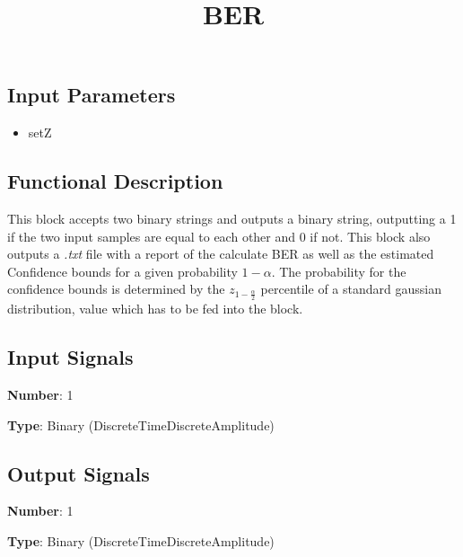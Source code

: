 \documentclass[a4paper]{article}
\title{BER}
\begin{document}
\maketitle

\subsection*{Input Parameters}

\begin{multicols}{2}
	\begin{itemize}
		\item setZ
	\end{itemize}
\end{multicols}

\subsection*{Functional Description}

This block accepts two binary strings and outputs a binary string, outputting a 1 if the two input samples are equal to each other and 0 if not. This block also outputs a \textit{.txt} file with a report of the calculate BER as well as the estimated Confidence bounds for a given probability $1-\alpha$. The probability for the confidence bounds is determined by the $z_{1-\frac{\alpha}{2}}$ percentile of a standard gaussian distribution, value which has to be fed into the block.

\subsection*{Input Signals}

\textbf{Number}: 1

\textbf{Type}: Binary (DiscreteTimeDiscreteAmplitude)

\subsection*{Output Signals}

\textbf{Number}: 1

\textbf{Type}: Binary (DiscreteTimeDiscreteAmplitude)
\end{document}
